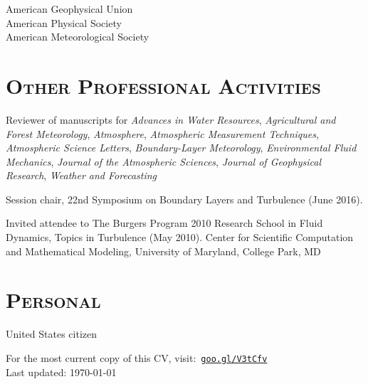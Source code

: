 \documentclass[11pt,letterpaper]{article}
\begin{document}
American Geophysical Union \\
American Physical Society \\
American Meteorological Society 


\section*{\textsc{Other Professional Activities}} 

Reviewer of manuscripts for \textit{Advances in Water Resources},
\textit{Agricultural and Forest Meteorology},
\textit{Atmosphere},
\textit{Atmospheric Measurement Techniques},
\textit{Atmospheric Science Letters}, \textit{Boundary-Layer Meteorology},
\textit{Environmental Fluid Mechanics}, \textit{Journal of the Atmospheric
  Sciences}, \textit{Journal of Geophysical Research}, \textit{Weather and Forecasting} 

Session chair, 22nd Symposium on Boundary Layers and Turbulence (June 2016).

Invited attendee to The Burgers Program 2010 Research School in Fluid Dynamics, Topics in Turbulence (May 2010). 
Center for Scientific Computation and Mathematical Modeling, University of Maryland, College Park, MD 

\section*{\textsc{Personal}} 
United States citizen

\smallskip
\begin{center}
{\small For the most current copy of this CV, visit:\, {\href{http://goo.gl/V3tCfv}{\texttt{goo.gl/V3tCfv}}} } \\
{\small Last updated: \today}
\end{center}
\end{document}
